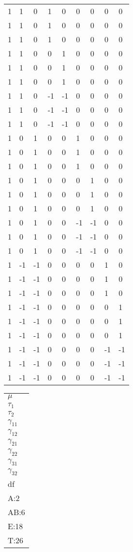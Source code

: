\documentclass[
  10pt,
  twocolumn]{article}
\begin{document}
\begin{tabular}{l|ll|ll|ll|ll|}
1& 1 & 0 & 1 & 0 & 0 & 0 & 0 & 0\\
1& 1 & 0 & 1 & 0 & 0 & 0 & 0 & 0\\
1& 1 & 0 & 1 & 0 & 0 & 0 & 0 & 0\\
1& 1 & 0 & 0 & 1 & 0 & 0 & 0 & 0\\
1& 1 & 0 & 0 & 1 & 0 & 0 & 0 & 0\\
1& 1 & 0 & 0 & 1 & 0 & 0 & 0 & 0\\
1& 1 & 0 &-1 &-1 & 0 & 0 & 0 & 0\\
1& 1 & 0 &-1 &-1 & 0 & 0 & 0 & 0\\
1& 1 & 0 &-1 &-1 & 0 & 0 & 0 & 0\\\hline
1& 0 & 1 & 0 & 0 & 1 & 0 & 0 & 0\\
1& 0 & 1 & 0 & 0 & 1 & 0 & 0 & 0\\
1& 0 & 1 & 0 & 0 & 1 & 0 & 0 & 0\\
1& 0 & 1 & 0 & 0 & 0 & 1 & 0 & 0\\
1& 0 & 1 & 0 & 0 & 0 & 1 & 0 & 0\\
1& 0 & 1 & 0 & 0 & 0 & 1 & 0 & 0\\
1& 0 & 1 & 0 & 0 &-1 &-1 & 0 & 0\\
1& 0 & 1 & 0 & 0 &-1 &-1 & 0 & 0\\
1& 0 & 1 & 0 & 0 &-1 &-1 & 0 & 0\\\hline
1&-1 &-1 & 0 & 0 & 0 & 0& 1 & 0\\
1&-1 &-1 & 0 & 0 & 0 & 0& 1 & 0\\
1&-1 &-1 & 0 & 0 & 0 & 0& 1 & 0\\
1&-1 &-1 & 0 & 0 & 0 & 0& 0 & 1\\
1&-1 &-1 & 0 & 0 & 0 & 0& 0 & 1\\
1&-1 &-1 & 0 & 0 & 0 & 0& 0 & 1\\
1&-1 &-1 & 0 & 0 & 0 & 0&-1 &-1\\
1&-1 &-1 & 0 & 0 & 0 & 0&-1 &-1\\
1&-1 &-1 & 0 & 0 & 0 & 0&-1 &-1\\\hline
\end{tabular}
\begin{tabular}{|l|}
$\mu$\\
$\tau_{1}$\\
$\tau_{2}$\\
$\gamma_{11}$\\
$\gamma_{12}$\\
$\gamma_{21}$\\
$\gamma_{22}$\\
$\gamma_{31}$\\
$\gamma_{32}$\\
df\\
A:2\\
AB:6\\
E:18\\
T:26
\end{tabular}
\end{document}
